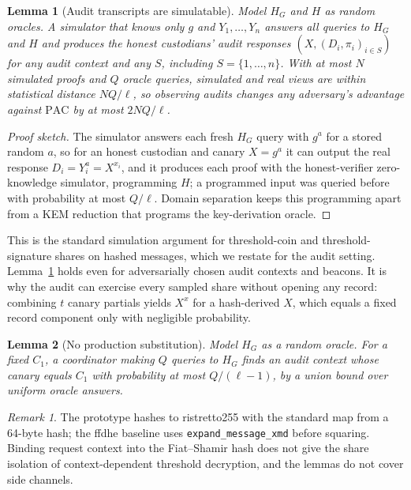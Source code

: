 \documentclass[Crown,sagev]{sagej}
\theoremstyle{plain}
\newtheorem{lemma}{Lemma}
\theoremstyle{definition}
\theoremstyle{remark}
\newtheorem{remark}{Remark}
\newcommand{\PAC}{\mathrm{PAC}}
\begin{document}
\begin{lemma}[Audit transcripts are simulatable]\label{lem:sim}
Model $H_G$ and $H$ as random oracles. A simulator that knows only $g$ and $Y_1,\dots,Y_n$ answers all queries to $H_G$ and $H$ and produces the honest custodians' audit responses $(X,(D_i,\pi_i)_{i\in S})$ for any audit context and any $S$, including $S=\{1,\dots,n\}$. With at most $N$ simulated proofs and $Q$ oracle queries, simulated and real views are within statistical distance $NQ/\ell$, so observing audits changes any adversary's advantage against $\PAC$ by at most $2NQ/\ell$.
\end{lemma}

\begin{proof}[Proof sketch]
The simulator answers each fresh $H_G$ query with $g^{a}$ for a stored random $a$, so for an honest custodian and canary $X=g^{a}$ it can output the real response $D_i=Y_i^{a}=X^{x_i}$, and it produces each proof with the honest-verifier zero-knowledge simulator, programming $H$; a programmed input was queried before with probability at most $Q/\ell$. Domain separation keeps this programming apart from a KEM reduction that programs the key-derivation oracle.
\end{proof}

This is the standard simulation argument for threshold-coin and threshold-signature shares on hashed messages\cite{cachin2005constantinople,boldyreva2003threshold}, which we restate for the audit setting. Lemma~\ref{lem:sim} holds even for adversarially chosen audit contexts and beacons. It is why the audit can exercise every sampled share without opening any record: combining $t$ canary partials yields $X^{x}$ for a hash-derived $X$, which equals a fixed record component only with negligible probability.

\begin{lemma}[No production substitution]\label{lem:subst}
Model $H_G$ as a random oracle. For a fixed $C_1$, a coordinator making $Q$ queries to $H_G$ finds an audit context whose canary equals $C_1$ with probability at most $Q/(\ell-1)$, by a union bound over uniform oracle answers.
\end{lemma}

\begin{remark}
The prototype hashes to ristretto255 with the standard map from a 64-byte hash\cite{rfc9496}; the ffdhe baseline uses \texttt{expand\_message\_xmd}\cite{rfc9380} before squaring. Binding request context into the Fiat--Shamir hash does not give the share isolation of context-dependent threshold decryption\cite{boneh2025context}, and the lemmas do not cover side channels.
\end{remark}
\end{document}
